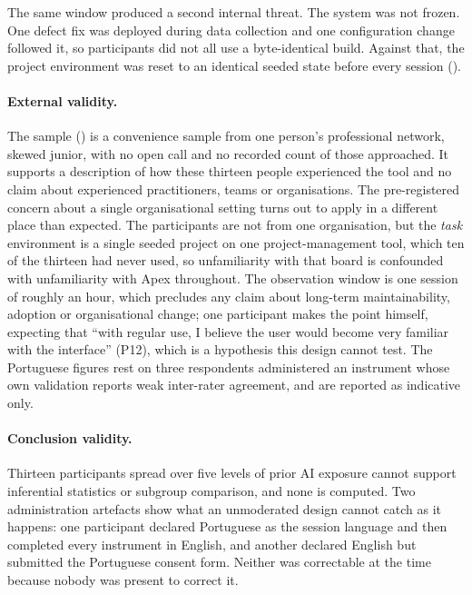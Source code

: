 The same window produced a second internal threat. The system was not frozen. One defect fix was deployed during data collection and one configuration change followed it, so participants did not all use a byte-identical build. Against that, the project environment was reset to an identical seeded state before every session ().

\paragraph{External validity.} The sample () is a convenience sample from one person's professional network, skewed junior, with no open call and no recorded count of those approached. It supports a description of how these thirteen people experienced the tool and no claim about experienced practitioners, teams or organisations. The pre-registered concern about a single organisational setting turns out to apply in a different place than expected. The participants are not from one organisation, but the \emph{task} environment is a single seeded project on one project-management tool, which ten of the thirteen had never used, so unfamiliarity with that board is confounded with unfamiliarity with Apex throughout. The observation window is one session of roughly an hour, which precludes any claim about long-term maintainability, adoption or organisational change; one participant makes the point himself, expecting that ``with regular use, I believe the user would become very familiar with the interface'' (P12), which is a hypothesis this design cannot test. The Portuguese figures rest on three respondents administered an instrument whose own validation reports weak inter-rater agreement, and are reported as indicative only.

\paragraph{Conclusion validity.} Thirteen participants spread over five levels of prior AI exposure cannot support inferential statistics or subgroup comparison, and none is computed. Two administration artefacts show what an unmoderated design cannot catch as it happens: one participant declared Portuguese as the session language and then completed every instrument in English, and another declared English but submitted the Portuguese consent form. Neither was correctable at the time because nobody was present to correct it.

